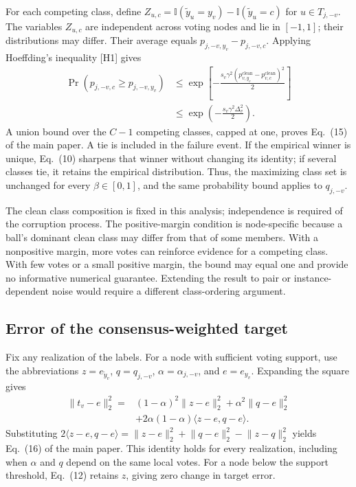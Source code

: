 For each competing class, define \(Z_{u,c}=\mathbb{I}(\widetilde y_u=y_v)-\mathbb{I}(\widetilde y_u=c)\) for \(u\in T_{j,-v}\). The variables \(Z_{u,c}\) are independent across voting nodes and lie in \([-1,1]\); their distributions may differ. Their average equals \(p_{j,-v,y_v}-p_{j,-v,c}\). Applying Hoeffding's inequality [H1] gives
\begin{equation}\label{eq:H.3}
\begin{aligned}
\Pr(p_{j,-v,c}\geq p_{j,-v,y_v})
&\leq\exp\!\left[-\frac{s_v\gamma^2(p^{\mathrm{clean}}_{v,y_v}-p^{\mathrm{clean}}_{v,c})^2}{2}\right]\\
&\leq\exp\!\left(-\frac{s_v\gamma^2\Delta_v^2}{2}\right).
\end{aligned}
\end{equation}
A union bound over the \(C-1\) competing classes, capped at one, proves Eq.~(15) of the main paper. A tie is included in the failure event. If the empirical winner is unique, Eq.~(10) sharpens that winner without changing its identity; if several classes tie, it retains the empirical distribution. Thus, the maximizing class set is unchanged for every \(\beta\in[0,1]\), and the same probability bound applies to \(q_{j,-v}\).

The clean class composition is fixed in this analysis; independence is required of the corruption process. The positive-margin condition is node-specific because a ball's dominant clean class may differ from that of some members. With a nonpositive margin, more votes can reinforce evidence for a competing class. With few votes or a small positive margin, the bound may equal one and provide no informative numerical guarantee. Extending the result to pair or instance-dependent noise would require a different class-ordering argument.

\subsection{Error of the consensus-weighted target}\label{sec:H.2}

Fix any realization of the labels. For a node with sufficient voting support, use the abbreviations \(z=e_{\widetilde y_v}\), \(q=q_{j,-v}\), \(\alpha=\alpha_{j,-v}\), and \(e=e_{y_v}\). Expanding the square gives
\begin{equation}\label{eq:H.4}
\begin{aligned}
\lVert t_v-e\rVert_2^2={}&(1-\alpha)^2\lVert z-e\rVert_2^2+\alpha^2\lVert q-e\rVert_2^2\\
&+2\alpha(1-\alpha)\langle z-e,q-e\rangle.
\end{aligned}
\end{equation}
Substituting \(2\langle z-e,q-e\rangle=\lVert z-e\rVert_2^2+\lVert q-e\rVert_2^2-\lVert z-q\rVert_2^2\) yields Eq.~(16) of the main paper. This identity holds for every realization, including when \(\alpha\) and \(q\) depend on the same local votes. For a node below the support threshold, Eq.~(12) retains \(z\), giving zero change in target error.

